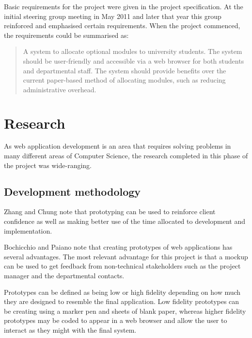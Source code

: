 \documentclass[]{scrartcl}
\begin{document}
Basic requirements for the project were given in the project specification. At
the initial steering group meeting in May 2011 and later that year this group
reinforced and emphasised certain requirements. When the project commenced,
the requirements could be summarised as:

\begin{quote}
  A system to allocate optional modules to university students. The system
  should be user-friendly and accessible via a web browser for both students
  and departmental staff. The system should provide benefits over the current
  paper-based method of allocating modules, such as reducing administrative
  overhead.
\end{quote}

\section{Research}
\label{sec:research}


As web application development is an area that requires solving problems in
many different areas of Computer Science, the research completed in this phase
of the project was wide-ranging.

\subsection{Development methodology}



Zhang and Chung \cite{MODFM_2003} note that prototyping can be used to
reinforce client confidence as well as making better use of the time allocated
to development and implementation.

Bochicchio and Paiano \cite{PrototypingWebApplications_2000} note that
creating prototypes of web applications has several advantages.
The most relevant advantage for this project is that a mockup can be used to
get feedback from non-technical stakeholders such as the project manager and
the departmental contacts.

Prototypes can be defined as being low or high fidelity depending on how much
they are designed to resemble the final application. Low fidelity prototypes
can be creating using a marker pen and sheets of blank paper, whereas higher
fidelity prototypes may be coded to appear in a web browser and allow the user
to interact as they might with the final system.
\end{document}
